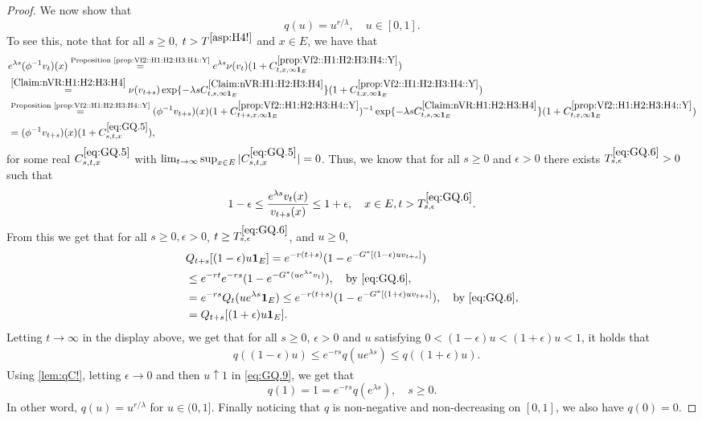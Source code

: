 \documentclass[12pt,a4paper]{amsart}
\numberwithin{equation}{section}
\theoremstyle{plain}
\theoremstyle{definition}
\theoremstyle{remark}
\begin{document}
\begin{proof}
	We now show that
\begin{equation} \label{Claim:GQ:H1:H2:H3:H4}
	q(u) = u^{r/\lambda},\quad u\in [0,1].
\end{equation}
	To see this, note that for all $s\geq 0$, $t>T^{\eqref{asp:H4!}}$ and $x\in E$, we have that
	\begin{align}
	& e^{\lambda s}(\phi^{-1}v_t)(x)
	\overset{\text{Proposition \ref{prop:Vf2::H1:H2:H3:H4::Y}}}= e^{\lambda s}\nu(v_{t})(1+ C^{\ref{prop:Vf2::H1:H2:H3:H4::Y}}_{t,x,\infty  \mathbf 1_E})
	\\&\overset{\eqref{Claim:nVR:H1:H2:H3:H4}}=\nu(v_{t+s}) \exp\{-\lambda sC^{\eqref{Claim:nVR:H1:H2:H3:H4}}_{t,s,\infty \mathbf 1_E}\} (1+ C^{\ref{prop:Vf2::H1:H2:H3:H4::Y}}_{t,x,\infty  \mathbf 1_E})
	\\&\overset{\text{Proposition \ref{prop:Vf2::H1:H2:H3:H4::Y}}}= (\phi^{-1}v_{t+s})(x) (1+ C^{\ref{prop:Vf2::H1:H2:H3:H4::Y}}_{t+s,x,\infty \mathbf 1_E})^{-1} \exp\{-\lambda sC^{\eqref{Claim:nVR:H1:H2:H3:H4}}_{t,s,\infty  \mathbf 1_E}\} (1+ C^{\ref{prop:Vf2::H1:H2:H3:H4::Y}}_{t,x,\infty  \mathbf 1_E})
	\\& \label{eq:GQ.5}= (\phi^{-1}v_{t+s})(x) (1+C_{s,t,x}^{\eqref{eq:GQ.5}}),
	\end{align}
	for some real $C_{s,t,x}^{\eqref{eq:GQ.5}}$ with $\lim_{t\to \infty}\sup_{x\in E} |C_{s,t,x}^{\eqref{eq:GQ.5}}| =0$.
	Thus, we know that for all $s\geq 0$ and $\epsilon >0$ there exists $T^{\eqref{eq:GQ.6}}_{s,\epsilon}>0$ such that
	\begin{equation} \label{eq:GQ.6}
	1-\epsilon
	\leq \frac{e^{\lambda s}v_t(x)}{v_{t+s}(x)}
	\leq 1+\epsilon,
	\quad x\in E, t> T^{\eqref{eq:GQ.6}}_{s,\epsilon}.
	\end{equation}
	From this we get that for all $s\geq 0, \epsilon > 0$, $t\ge T^{\eqref{eq:GQ.6}}_{s,\epsilon}$, and $u\geq 0$,
	\begin{align}
	& Q_{t+s}[ (1-\epsilon)u \mathbf 1_E ]
	= e^{-r (t+s)}( 1-e^{-G^*[(1-\epsilon)uv_{t+s}]} )
	\\ & \leq e^{-r t} e^{-r s}( 1- e^{-G^*(ue^{\lambda s}v_t)} ),\quad\text{by \eqref{eq:GQ.6}},
	\\\label{eq:GQ.7}&= e^{-r s}Q_t(ue^{\lambda s}  \mathbf 1_E)
	\leq e^{-r(t+s)}( 1-e^{-G^*[(1+\epsilon)uv_{t+s}]} ),\quad\text{by \eqref{eq:GQ.6}},
	\\\label{eq:GQ.8}&= Q_{t+s}[ (1+\epsilon)u \mathbf 1_E ].
	\end{align}
	Letting $t\to \infty$ in the display above, we get that for all $s\geq 0$, $\epsilon > 0$ and $u$ satisfying $0 < (1 - \epsilon) u < (1+\epsilon)u < 1$, it holds that
\begin{align} \label{eq:GQ.9}
	& q((1-\epsilon)u)
	\leq e^{-r s}q(u e^{\lambda s})
	\leq q((1+\epsilon)u).
\end{align}
	Using \eqref{lem:qC!}, letting $\epsilon \to 0$ and then $u \uparrow 1$ in \eqref{eq:GQ.9}, we get that
\[
	q(1)
	=1
	= e^{- r s} q(e^{\lambda s}),
	\quad s \geq 0.
\]
	In other word, $q(u) = u^{r/\lambda}$ for $u\in (0,1]$.
	Finally noticing that $q$ is non-negative and non-decreasing on $[0,1]$, we also have $q(0) = 0$.


\end{proof}
\end{document}

